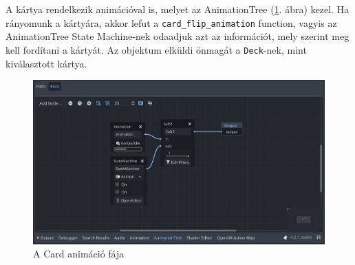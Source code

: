 A kártya rendelkezik animációval is, melyet az AnimationTree (\ref{img:animation_tree}. ábra) kezel. 
Ha rányomunk a kártyára, akkor lefut a \lstinline|card_flip_animation| function, vagyis az AnimationTree State Machine-nek odaadjuk azt az információt, mely szerint meg kell fordítani a kártyát. Az objektum elküldi önmagát a \lstinline|Deck|-nek, mint kiválasztott kártya. 
\begin{figure}[h]
    \centering
    \includegraphics[width=\textwidth]{img/animation_tree.png}
    \caption{A Card animáció fája}
    \label{img:animation_tree}  
\end{figure}



